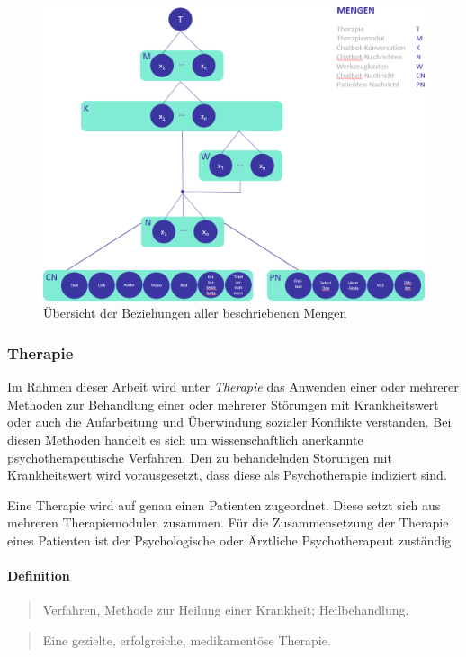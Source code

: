 \begin{figure}[h]
	\centering
	\includegraphics[width=.75\textwidth]{pictures/mengeninsg}
	\caption{Übersicht der Beziehungen aller beschriebenen Mengen}
	\label{mengeninsg}
\end{figure}

\subsubsection{Therapie}
Im Rahmen dieser Arbeit wird unter \emph{Therapie} das Anwenden  einer oder mehrerer Methoden zur Behandlung einer oder mehrerer Störungen mit Krankheitswert oder auch die Aufarbeitung und Überwindung sozialer Konflikte verstanden. Bei diesen Methoden handelt es sich um wissenschaftlich anerkannte psychotherapeutische Verfahren. Den zu behandelnden Störungen mit Krankheitswert wird vorausgesetzt, dass diese als Psychotherapie indiziert sind.

Eine Therapie wird auf genau  einen Patienten zugeordnet. Diese setzt sich aus mehreren Therapiemodulen zusammen. Für die Zusammensetzung der Therapie eines Patienten ist der Psychologische oder Ärztliche Psychotherapeut zuständig.

\paragraph{Definition}
\begin{quote}
Verfahren, Methode zur Heilung einer Krankheit; Heilbehandlung. \cite{PsychThG4:online}
\end{quote}

\begin{quote}
	Eine gezielte, erfolgreiche, medikamentöse Therapie. \cite{44:online}
\end{quote}

